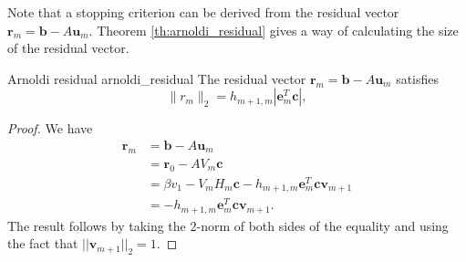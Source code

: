 Note that a stopping criterion can be derived from the residual vector $\mathbf{r}_m = \mathbf{b} - A\mathbf{u}_m$. Theorem \ref{th:arnoldi_residual} gives a way of calculating the size of the residual vector.
\begin{APPfancyth}{Arnoldi residual \cite[Proposition 6.7]{iter_method_saad}}{arnoldi_residual}
  The residual vector $\mathbf{r}_m = \mathbf{b} - A\mathbf{u}_m$ satisfies
  \begin{equation}
    \|r_m\|_2 = h_{m+1,m}|\mathbf{e}^T_m \mathbf{c}|,
  \end{equation}
\end{APPfancyth}
\begin{proof}
  We have
  \begin{align*}
    \mathbf{r}_m & = \mathbf{b} - A\mathbf{u}_m                                                   \\
                  & = \mathbf{r}_0 - AV_m \mathbf{c}                                               \\
                  & = \beta v_1 - V_m H_m \mathbf{c} - h_{m+1,m} \mathbf{e}_m^T \mathbf{c} \mathbf{v}_{m+1} \\
                  & = - h_{m+1,m} \mathbf{e}_m^T \mathbf{c} \mathbf{v}_{m+1}.
  \end{align*}
  The result follows by taking the $2$-norm of both sides of the equality and using the fact that $||\mathbf{v}_{m+1}||_2 = 1$.
\end{proof}

